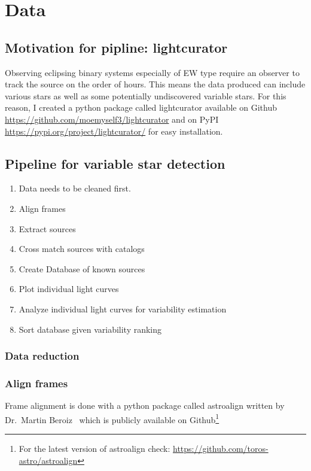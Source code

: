 \chapter{Data}
\label{chp:data}

\section{Motivation for pipline: lightcurator}
Observing eclipsing binary systems especially of EW type require an observer to track the source on the order of hours.
This means the data produced can include various stars as well as some potentially undiscovered variable stars.
For this reason, I created a python package called lightcurator available on Github \url{https://github.com/moemyself3/lightcurator}
and on PyPI \url{https://pypi.org/project/lightcurator/} for easy installation.

\section{Pipeline for variable star detection}
\begin{enumerate}
    \item Data needs to be cleaned first.
    \item Align frames
    \item Extract sources
    \item Cross match sources with catalogs
    \item Create Database of known sources
    \item Plot individual light curves
    \item Analyze individual light curves for variability estimation
    \item Sort database given variability ranking
\end{enumerate}

\subsection{Data reduction}
\subsection{Align frames}
Frame alignment is done with a python package called astroalign written by Dr.\ Martin Beroiz~\cite{beroiz_2019} which is publicly
available on Github\footnote{For the latest version of astroalign check: \url{https://github.com/toros-astro/astroalign}}

